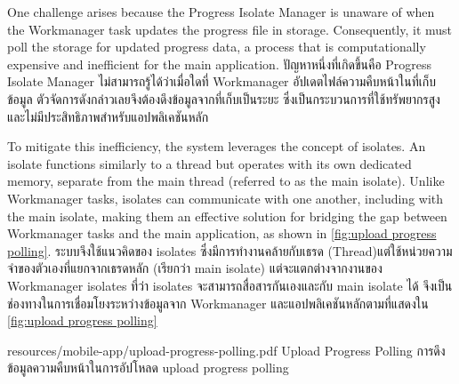 \ifenglish
One challenge arises because the Progress Isolate Manager is unaware of when the Workmanager task updates the progress file in storage. Consequently, it must poll the storage for updated progress data, a process that is computationally expensive and inefficient for the main application.
\else
ปัญหาหนึ่งที่เกิดขึ้นคือ Progress Isolate Manager ไม่สามารถรู้ได้ว่าเมื่อใดที่ Workmanager อัปเดตไฟล์ความคืบหน้าในที่เก็บข้อมูล ตัวจัดการดังกล่าวเลยจึงต้องดึงข้อมูลจากที่เก็บเป็นระยะ ซึ่งเป็นกระบวนการที่ใช้ทรัพยากรสูงและไม่มีประสิทธิภาพสำหรับแอปพลิเคชันหลัก
\fi

\ifenglish
To mitigate this inefficiency, the system leverages the concept of isolates. An isolate functions similarly to a thread but operates with its own dedicated memory, separate from the main thread (referred to as the main isolate). Unlike Workmanager tasks, isolates can communicate with one another, including with the main isolate, making them an effective solution for bridging the gap between Workmanager tasks and the main application, as shown in \autoref{fig:upload progress polling}.
\else
ระบบจึงใช้แนวคิดของ isolates ซึ่งมีการทำงานคล้ายกับเธรด (Thread)แต่ใช้หน่วยความจำของตัวเองที่แยกจากเธรดหลัก (เรียกว่า main isolate) แต่จะแตกต่างจากงานของ Workmanager isolates ที่ว่า isolates จะสามารถสื่อสารกันเองและกับ main isolate ได้ จึงเป็นช่องทางในการเชื่อมโยงระหว่างข้อมูลจาก Workmanager และแอปพลิเคชันหลักตามที่แสดงใน \autoref{fig:upload progress polling}
\fi

\insertPDFfigure
{resources/mobile-app/upload-progress-polling.pdf}
{\ifenglish Upload Progress Polling \else การดึงข้อมูลความคืบหน้าในการอัปโหลด \fi}
{upload progress polling}
